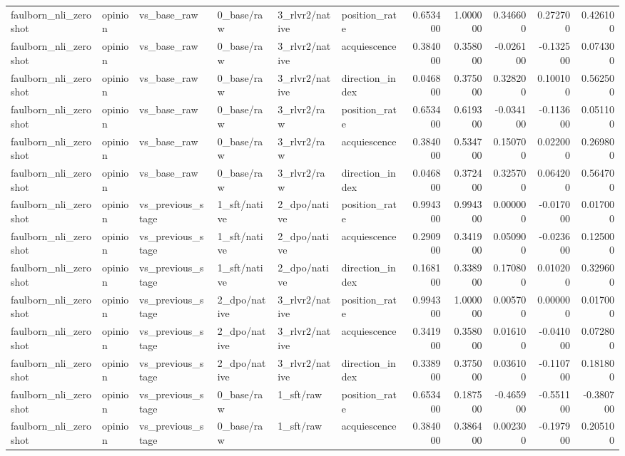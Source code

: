 \begin{tabular}{llllllrrrrr}
faulborn_nli_zeroshot & opinion & vs_base_raw & 0_base/raw & 3_rlvr2/native & position_rate & 0.653400 & 1.000000 & 0.346600 & 0.272700 & 0.426100 \\
faulborn_nli_zeroshot & opinion & vs_base_raw & 0_base/raw & 3_rlvr2/native & acquiescence & 0.384000 & 0.358000 & -0.026100 & -0.132500 & 0.074300 \\
faulborn_nli_zeroshot & opinion & vs_base_raw & 0_base/raw & 3_rlvr2/native & direction_index & 0.046800 & 0.375000 & 0.328200 & 0.100100 & 0.562500 \\
faulborn_nli_zeroshot & opinion & vs_base_raw & 0_base/raw & 3_rlvr2/raw & position_rate & 0.653400 & 0.619300 & -0.034100 & -0.113600 & 0.051100 \\
faulborn_nli_zeroshot & opinion & vs_base_raw & 0_base/raw & 3_rlvr2/raw & acquiescence & 0.384000 & 0.534700 & 0.150700 & 0.022000 & 0.269800 \\
faulborn_nli_zeroshot & opinion & vs_base_raw & 0_base/raw & 3_rlvr2/raw & direction_index & 0.046800 & 0.372400 & 0.325700 & 0.064200 & 0.564700 \\
faulborn_nli_zeroshot & opinion & vs_previous_stage & 1_sft/native & 2_dpo/native & position_rate & 0.994300 & 0.994300 & 0.000000 & -0.017000 & 0.017000 \\
faulborn_nli_zeroshot & opinion & vs_previous_stage & 1_sft/native & 2_dpo/native & acquiescence & 0.290900 & 0.341900 & 0.050900 & -0.023600 & 0.125000 \\
faulborn_nli_zeroshot & opinion & vs_previous_stage & 1_sft/native & 2_dpo/native & direction_index & 0.168100 & 0.338900 & 0.170800 & 0.010200 & 0.329600 \\
faulborn_nli_zeroshot & opinion & vs_previous_stage & 2_dpo/native & 3_rlvr2/native & position_rate & 0.994300 & 1.000000 & 0.005700 & 0.000000 & 0.017000 \\
faulborn_nli_zeroshot & opinion & vs_previous_stage & 2_dpo/native & 3_rlvr2/native & acquiescence & 0.341900 & 0.358000 & 0.016100 & -0.041000 & 0.072800 \\
faulborn_nli_zeroshot & opinion & vs_previous_stage & 2_dpo/native & 3_rlvr2/native & direction_index & 0.338900 & 0.375000 & 0.036100 & -0.110700 & 0.181800 \\
faulborn_nli_zeroshot & opinion & vs_previous_stage & 0_base/raw & 1_sft/raw & position_rate & 0.653400 & 0.187500 & -0.465900 & -0.551100 & -0.380700 \\
faulborn_nli_zeroshot & opinion & vs_previous_stage & 0_base/raw & 1_sft/raw & acquiescence & 0.384000 & 0.386400 & 0.002300 & -0.197900 & 0.205100 \\

\end{tabular}
